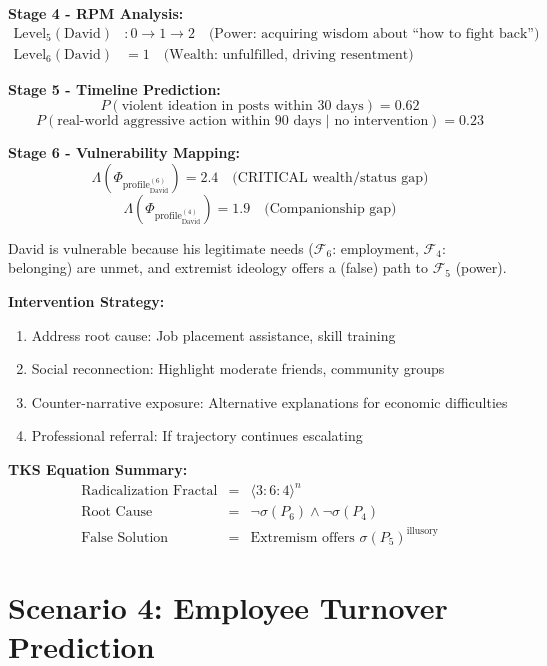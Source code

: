 \documentclass[11pt,twoside]{book}
\newcommand{\Foundations}{\mathcal{F}}
\newcommand{\Lacunarity}{\Lambda}
\newcommand{\ProfileFrac}{\Phi_{\mathrm{profile}}}
\begin{document}
\begin{tcolorbox}[colback=yellow!5!white,colframe=yellow!65!black,title=\textbf{Scenario: Tracking David's Radicalization Risk},breakable]
\textbf{Stage 4 - RPM Analysis:}
\begin{align*}
    \mathrm{Level}_5(\text{David}) &: 0 \to 1 \to 2 \quad \text{(Power: acquiring wisdom about ``how to fight back'')} \\
    \mathrm{Level}_6(\text{David}) &= 1 \quad \text{(Wealth: unfulfilled, driving resentment)}
\end{align*}

\textbf{Stage 5 - Timeline Prediction:}
\[
    P(\text{violent ideation in posts within 30 days}) = 0.62
\]
\[
    P(\text{real-world aggressive action within 90 days | no intervention}) = 0.23
\]

\textbf{Stage 6 - Vulnerability Mapping:}
\[
    \Lacunarity(\ProfileFrac_{\text{David}}^{(6)}) = 2.4 \quad \text{(CRITICAL wealth/status gap)}
\]
\[
    \Lacunarity(\ProfileFrac_{\text{David}}^{(4)}) = 1.9 \quad \text{(Companionship gap)}
\]

David is vulnerable because his legitimate needs ($\Foundations_6$: employment, $\Foundations_4$: belonging) are unmet, and extremist ideology offers a (false) path to $\Foundations_5$ (power).

\textbf{Intervention Strategy:}
\begin{enumerate}
    \item Address root cause: Job placement assistance, skill training
    \item Social reconnection: Highlight moderate friends, community groups
    \item Counter-narrative exposure: Alternative explanations for economic difficulties
    \item Professional referral: If trajectory continues escalating
\end{enumerate}

\textbf{TKS Equation Summary:}
\begin{equation}
\boxed{
    \begin{array}{rcl}
    \text{Radicalization Fractal} &=& \langle 3:6:4 \rangle^n \\
    \text{Root Cause} &=& \neg\sigma(P_6) \land \neg\sigma(P_4) \\
    \text{False Solution} &=& \text{Extremism offers } \sigma(P_5)^{\text{illusory}}
    \end{array}
}
\end{equation}

\end{tcolorbox}

\chapter{Scenario 4: Employee Turnover Prediction}
\label{ch:scenario-turnover}
\end{document}
